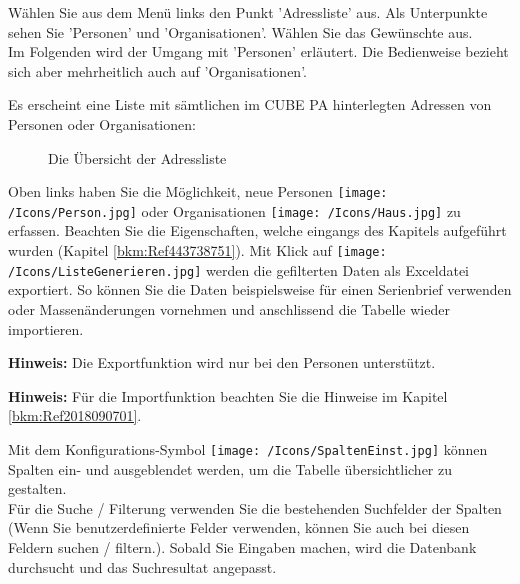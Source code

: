 Wählen Sie aus dem Menü links den Punkt 'Adressliste' aus. Als Unterpunkte sehen Sie 'Personen' und 'Organisationen'. Wählen Sie das Gewünschte aus.\\
Im Folgenden wird der Umgang mit 'Personen' erläutert. Die Bedienweise bezieht sich aber mehrheitlich auch auf 'Organisationen'.

\vspace{4cm}

Es erscheint eine Liste mit sämtlichen im CUBE PA hinterlegten Adressen von Personen oder Organisationen:

\begin{figure}[H]
\caption{Die Übersicht der Adressliste}
\end{figure}

Oben links haben Sie die Möglichkeit, neue Personen \texttt{[image: /Icons/Person.jpg]} oder Organisationen \texttt{[image: /Icons/Haus.jpg]} zu erfassen. Beachten Sie die Eigenschaften, welche eingangs des Kapitels aufgeführt wurden (Kapitel \ref{bkm:Ref443738751}). \newline
Mit Klick auf \texttt{[image: /Icons/ListeGenerieren.jpg]}  werden die gefilterten Daten als Exceldatei exportiert. So können Sie die Daten beispielsweise für einen Serienbrief verwenden oder Massenänderungen vornehmen und anschlissend die Tabelle wieder importieren. 

\vspace{\baselineskip}

\textbf{Hinweis:} Die Exportfunktion wird nur bei den Personen unterstützt.

\textbf{Hinweis:} Für die Importfunktion beachten Sie die Hinweise im Kapitel \ref{bkm:Ref2018090701}.

\vspace{\baselineskip}

Mit dem Konfigurations-Symbol \texttt{[image: /Icons/SpaltenEinst.jpg]}  können Spalten ein- und ausgeblendet werden, um die Tabelle übersichtlicher zu gestalten. \\
Für die Suche / Filterung verwenden Sie die bestehenden Suchfelder  der Spalten (Wenn Sie benutzerdefinierte Felder verwenden, können Sie auch bei diesen Feldern suchen / filtern.). Sobald Sie Eingaben machen, wird die Datenbank durchsucht und das Suchresultat angepasst.

